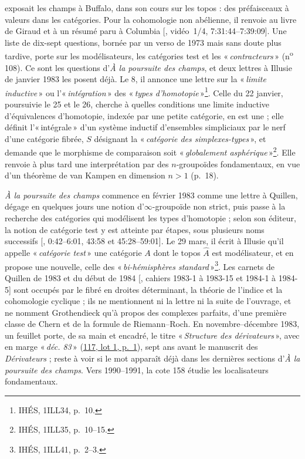 \documentclass[11pt]{amsart}
\makeatletter
\newcommand{\ts}[1]{\foreignlanguage{english}{#1}}
\newcommand{\q}[1]{«\,\textit{#1}\,»}
\newcommand{\mot}[1]{«\,#1\,»}
\newcommand{\cote}[1]{\mbox{n\textsuperscript{o}\,#1}}
\def\RHM@first#1--#2\@nil{#1}
\DeclareRobustCommand{\lot}[3]{\begingroup\edef\RHM@pdfpage{\the\numexpr\RHM@first#3--\@nil+1\relax}\href{https://grothendieck.umontpellier.fr/#1.pdf\#page=\RHM@pdfpage}{#1, lot #2, p.~#3}\endgroup}
\newcommand{\lot}[3]{\href{https://grothendieck.commutator.io/\##1/#2/p#3}{#1, lot #2, p.~#3}}
\makeatother
\begin{document}
exposait les champs à Buffalo, dans son cours sur les topos : des préfaisceaux à valeurs dans les catégories. Pour la cohomologie non abélienne, il renvoie au livre de Giraud et à un résumé paru à Columbia [\citealp{buffalo1973topos}, vidéo~1/4, \ts{7:31:44--7:39:09}]. Une liste de dix-sept questions, bornée par un verso de 1973 mais sans doute plus tardive, porte sur les modélisateurs, les catégories test et les \q{contracteurs} (\cote{108}). Ce sont les questions d'\emph{À la poursuite des champs}, et deux lettres à Illusie de janvier 1983 les posent déjà. Le 8, il annonce une lettre sur la \q{limite inductive} ou l'\q{intégration} des \q{types d'homotopie}\footnote{IHÉS, 1ILL34, p.~10.}. Celle du 22 janvier, poursuivie le 25 et le 26, cherche à quelles conditions une limite inductive d'équivalences d'homotopie, indexée par une petite catégorie, en est une ; elle définit l'\mot{intégrale} d'un système inductif d'ensembles simpliciaux par le nerf d'une catégorie fibrée, $S$ désignant la \q{catégorie des simplexes-types}, et demande que le morphisme de comparaison soit \q{globalement asphérique}\footnote{IHÉS, 1ILL35, p.~10--15.}. Elle renvoie à plus tard une interprétation par des $n$-groupoïdes fondamentaux, en vue d'un théorème de van Kampen en dimension $n > 1$ (p.~18).

\emph{À la poursuite des champs} commence en février 1983 comme une lettre à Quillen, dégage en quelques jours une notion d'$\infty$-groupoïde non strict, puis passe à la recherche des catégories qui modélisent les types d'homotopie ; selon son éditeur, la notion de catégorie test y est atteinte par étapes, sous plusieurs noms successifs [\citealp{maltsiniotis2018}, \ts{0:42--6:01}, \ts{43:58} et \ts{45:28--59:01}]. Le 29 mars, il écrit à Illusie qu'il appelle \q{catégorie test} une catégorie $A$ dont le topos $\widehat{A}$ est modélisateur, et en propose une nouvelle, celle des \q{bi-hémisphères standard}\footnote{IHÉS, 1ILL41, p.~2--3.}. Les carnets de Quillen de 1983 et du début de 1984 [\citealp{quillennotebooks}, cahiers 1983-1 à 1983-15 et 1984-1 à 1984-5] sont occupés par le fibré en droites déterminant, la théorie de l'indice et la cohomologie cyclique ; ils ne mentionnent ni la lettre ni la suite de l'ouvrage, et ne nomment Grothendieck qu'à propos des complexes parfaits, d'une première classe de Chern et de la formule de Riemann--Roch. En novembre--décembre 1983, un feuillet porte, de sa main et encadré, le titre \q{Structure des dérivateurs}, avec en marge \q{déc. 83} (\lot{117}{1}{1}), sept ans avant le manuscrit des \emph{Dérivateurs} ; reste à voir si le mot apparaît déjà dans les dernières sections d'\emph{À la poursuite des champs}. Vers 1990--1991, la cote 158 étudie les localisateurs fondamentaux.
\end{document}
